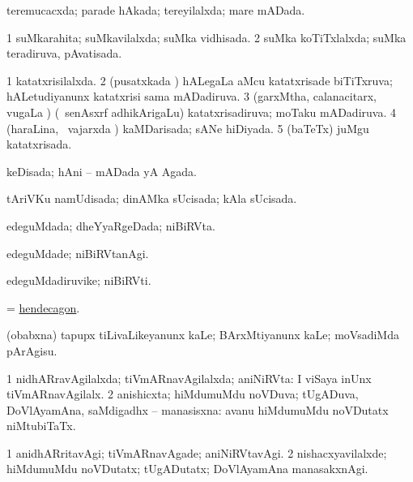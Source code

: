 \bentry
{} 
\gl{\gu}
\expl{}
\bmng
 teremucacxda; parade hAkada; tereyilalxda; mare mADada. 
\emng
\eentry

\bentry
{} 
\gl{\gu}
\expl{}
\bmng
\bnum
\num{1} suMkarahita; suMkavilalxda; suMka vidhisada. 
\num{2} suMka koTiTxlalxda; suMka teradiruva, pAvatisada. 
\enum
\emng
\eentry

\bentry
{} 
\gl{\gu}
\expl{}
\bmng
\bnum
\num{1} katatxrisilalxda. 
\num{2} (pusatxkada \vi) hALegaLa aMcu katatxrisade biTiTxruva; hALetudiyanunx katatxrisi sama mADadiruva. 
\num{3} (garxMtha, calanacitarx, \mo vugaLa \vi) (\kanmu\ senAsxrf adhikArigaLu) katatxrisadiruva; moTaku mADadiruva. 
\num{4} (haraLina, \kanmu\ vajarxda \vi) kaMDarisada; sANe hiDiyada. 
\num{5} (baTeTx) juMgu katatxrisada. 
\enum
\emng
\eentry

\bentry
{} 
\gl{\gu}
\expl{}
\bmng
keDisada; hAni -- mADada yA Agada. 
\emng
\eentry

\bentry
{} 
\gl{\gu}
\bmng
 tAriVKu namUdisada; dinAMka sUcisada; kAla sUcisada. 
\emng
\eentry

\bentry
{} 
\gl{\gu}
\expl{}
\bmng
 edeguMdada; dheYyaRgeDada; niBiRVta. 
\emng
\eentry

\bentry
{} 
\gl{\kirxvi}
\expl{}
\bmng
 edeguMdade; niBiRVtanAgi. 
\emng
\eentry

\bentry
{} 
\gl{\nA}
\expl{}
\bmng
 edeguMdadiruvike; niBiRVti. 
\emng
\eentry

\bentry
{} 
\gl{\nA}
\expl{}
\bmng
 = \hyperref{kandict_h.pdf}{H}{hendecagon}{hendecagon}. 
\emng
\eentry

\bentry
{} 
\gl{\sakirx}
\expl{}
\bmng
(obabxna) tapupx tiLivaLikeyanunx kaLe; BArxMtiyanunx kaLe; moVsadiMda pArAgisu. 
\emng
\eentry

\bentry
{} 
\gl{\gu}
\expl{}
\bmng
\bnum
\num{1} nidhARravAgilalxda; tiVmARnavAgilalxda; aniNiRVta:  I viSaya inUnx tiVmARnavAgilalx. 
\num{2} anishicxta; hiMdumuMdu noVDuva; tUgADuva, DoVlAyamAna, saMdigadhx -- manasisxna:  avanu hiMdumuMdu noVDutatx niMtubiTaTx. 
\enum
\emng
\eentry

\bentry
{} 
\gl{\kirxvi}
\expl{}
\bmng
\bnum
\num{1} anidhARritavAgi; tiVmARnavAgade; aniNiRVtavAgi. 
\num{2} nishacxyavilalxde; hiMdumuMdu noVDutatx; tUgADutatx; DoVlAyamAna manasakxnAgi. 
\enum
\emng
\eentry

